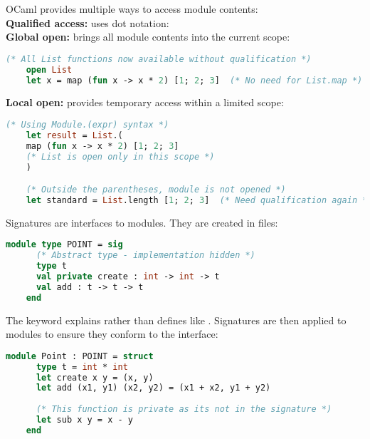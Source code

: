 \newpage 

\begin{Def}
    OCaml provides multiple ways to access module contents:\\

    \noindent
    \textbf{Qualified access:} uses dot notation: \\
        
    \noindent
    \textbf{Global open:} brings all module contents into the current scope:
        \begin{lstlisting}[language=OCaml, numbers=none]
    (* All List functions now available without qualification *)
    open List  
    let x = map (fun x -> x * 2) [1; 2; 3]  (* No need for List.map *)
        \end{lstlisting}
        
    \noindent
    \textbf{Local open:} provides temporary access within a limited scope:
        \begin{lstlisting}[language=OCaml, numbers=none]
    (* Using Module.(expr) syntax *)
    let result = List.(
    map (fun x -> x * 2) [1; 2; 3]  
    (* List is open only in this scope *)
    )

    (* Outside the parentheses, module is not opened *)
    let standard = List.length [1; 2; 3]  (* Need qualification again *)
        \end{lstlisting}
 
\end{Def}

\begin{Def}
    
    Signatures are interfaces to modules. They 
    are created in  files:

    \begin{lstlisting}[language=OCaml, numbers=none]
    module type POINT = sig
      (* Abstract type - implementation hidden *)  
      type t              
      val private create : int -> int -> t
      val add : t -> t -> t
    end
    \end{lstlisting}

    \noindent
    The  keyword explains rather than defines like . Signatures are then applied to modules to ensure they conform to the interface:
    
    \begin{lstlisting}[language=OCaml, numbers=none]
    module Point : POINT = struct
      type t = int * int
      let create x y = (x, y)
      let add (x1, y1) (x2, y2) = (x1 + x2, y1 + y2)
      
      (* This function is private as its not in the signature *)
      let sub x y = x - y 
    end
    \end{lstlisting}
\end{Def}

